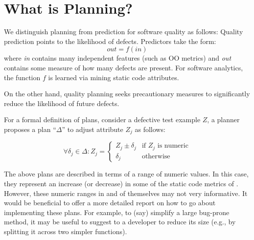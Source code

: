 \section{What is Planning?}
\label{sect:planning_intro}
We distinguish planning from prediction for software quality as follows: 
Quality prediction points to the likelihood of defects. Predictors take the form:
\begin{equation*}
  out = f(in)  
\end{equation*}
where {\em in} contains many independent features (such as OO metrics) and {\em out} contains some measure of
how many defects are present. For software analytics, the function $f$ is learned via mining static code attributes.



On the other hand, quality planning seeks  precautionary measures to significantly reduce the likelihood of future defects.

For a formal definition of plans, consider a defective test example $Z$, a planner
proposes a plan ``$\Delta$'' to adjust attribute $Z_j$ as follows:

{\small\[
\forall \delta_j \in \Delta : Z_j = 
\begin{cases}
   Z_j \pm \delta_j& \text{if $Z_j$ is numeric}\\
  \delta_j       & \text{otherwise}
\end{cases}
\]}

The above plans are described in terms of a range of numeric values. In this case, they represent an increase (or decrease) in some of the static code metrics of . However, these numeric ranges in and of themselves may not very informative. It would be beneficial to offer a more detailed report on how to go about implementing these plans. For example, to (say) simplify a large bug-prone method, it may be useful to suggest to a developer to reduce its size (e.g., by splitting it across two simpler functions).


